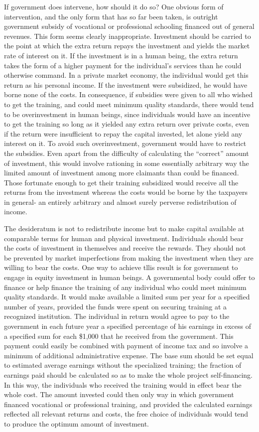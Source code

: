 \documentclass[11pt,openany]{book}
\begin{document}
If government does intervene, how should it do so? One obvious form of intervention, and the only form that has so far been taken, is outright government subsidy of vocational or professional schooling financed out of general revenues. This form seems clearly inappropriate. Investment should be carried to the point at which the extra return repays the investment and yields the market rate of interest on it. If the investment is in a human being, the extra return takes the form of a higher payment for the individual's services than he could otherwise command. In a private market economy, the individual would get this return as his personal income. If the investment were subsidized, he would have borne none of the costs. In consequence, if subsidies were given to all who wished to get the training, and could meet minimum quality standards, there would tend to be overinvestment in human beings, since individuals would have an incentive to get the training so long as it yielded any extra return over private costs, even if the return were insufficient to repay the capital invested, let alone yield any interest on it. To avoid such overinvestment, government would have to restrict the subsidies. Even apart from the difficulty of calculating the ``correct'' amount of investment, this would involve rationing in some essentially arbitrary way the limited amount of investment among more claimants than could be financed. Those fortunate enough to get their training subsidized would receive all the returns from the investment whereas the costs would be borne by the taxpayers in general- an entirely arbitrary and almost surely perverse redistribution of income.

The desideratum is not to redistribute income but to make capital available at comparable terms for human and physical investment. Individuals should bear the costs of investment in themselves and receive the rewards. They should not be prevented by market imperfections from making the investment when they are willing to bear the costs. One way to achieve tllis result is for government to engage in equity investment in human beings. A governmental body could offer to finance or help finance the training of any individual who could meet minimum quality standards. It would make available a limited sum per year for a specified number of years, provided the funds were spent on securing training at a recognized institution. The individual in return would agree to pay to the government in each future year a specified percentage of his earnings in excess of a specified sum for each \$1,000 that he received from the government. This payment could easily be combined with payment of income tax and so involve a minimum of additional administrative expense. The base sum should be set equal to estimated average earnings without the specialized training; the fraction of earnings paid should be calculated so as to make the whole project self-financing. In this way, the individuals who received the training would in effect bear the whole cost. The amount invested could then only way in which government financed vocational or professional training, and provided the calculated earnings reflected all relevant returns and costs, the free choice of individuals would tend to produce the optimum amount of investment.
\end{document}
